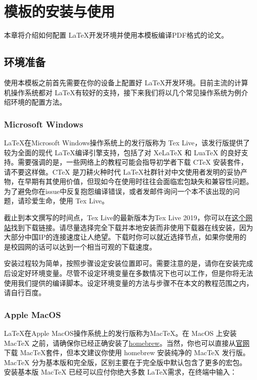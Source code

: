 \chapter{模板的安装与使用}
\label{chp:installation}

本章将介绍如何配置 \LaTeX 开发环境并使用本模板编译PDF格式的论文。

\section{环境准备}
\label{sec:tex_environment}

使用本模板之前首先需要在你的设备上配置好 \LaTeX 开发环境。目前主流的计算机操作系统都对 \LaTeX 有较好的支持，接下来我们将以几个常见操作系统为例介绍环境的配置方法。

\subsection{Microsoft Windows\texttrademark}

\LaTeX 在Microsoft Windows操作系统上的发行版称为 Tex Live，该发行版提供了较为全面的现代 \LaTeX 编译引擎支持，包括了对 XeLaTeX 和 LuaTeX 的良好支持。需要强调的是，一些网络上的教程可能会指导初学者下载 CTeX 安装套件，请不要这样做。CTeX 是刀耕火种时代 \LaTeX 社群针对中文使用者发明的妥协产物，在早期有其使用价值，但现如今在使用时往往会面临宏包缺失和兼容性问题\cite{muzi2020ctex}。为了避免你在issue中反复抱怨编译错误，或者发邮件询问一个本不该出现的问题，请珍爱生命，使用 Tex Live。

截止到本文撰写的时间点，Tex Live的最新版本为Tex Live 2019，你可以在\href{http://tug.org/texlive/}{这个网站}找到下载链接。请尽量选择完全下载并本地安装而非使用下载器在线安装，因为大部分中国IP的连接速度让人绝望。下载时你可以就近选择节点，如果你使用的是校园网的话可以达到一个相当可观的下载速度。

安装过程较为简单，按照步骤设定安装位置即可。需要注意的是，请你在安装完成后设定好环境变量。尽管不设定环境变量在多数情况下也可以工作，但是你将无法使用我们提供的编译脚本。设定环境变量的方法与步骤不在本文的教程范围之内，请自行百度。

\subsection{Apple MacOS\texttrademark}

\LaTeX 在Apple MacOS操作系统上的发行版称为MacTeX。在 MacOS 上安装 MacTeX 之前，请确保你已经正确安装了\href{https://brew.sh/}{homebrew}。当然，你也可以直接从\href{http://www.tug.org/mactex/index.html}{官网}下载 MacTeX套件，但本文建议你使用 homebrew 安装纯净的 MacTeX 发行版。MacTeX 分为基本版和完全版，区别主要在于完全版中默认包含了更多的宏包。安装基本版 MacTeX 已经可以应付你绝大多数 \LaTeX 需求，在终端中输入：

